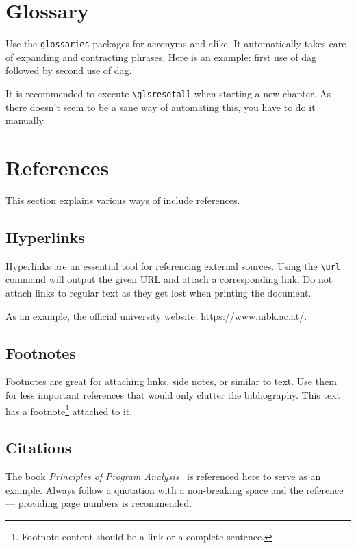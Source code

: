 \section{Glossary}

Use the \texttt{glossaries} packages for acronyms and alike.
It automatically takes care of expanding and contracting phrases.
Here is an example: first use of \gls{dag} followed by second use of \gls{dag}.

It is recommended to execute \texttt{\textbackslash{}glsresetall} when starting a new chapter.
As there doesn't seem to be a sane way of automating this, you have to do it manually.

\section{References}

This section explains various ways of include references.

\subsection{Hyperlinks}

Hyperlinks are an essential tool for referencing external sources.
Using the \texttt{\textbackslash{}url} command will output the given URL and attach a corresponding link.
Do not attach links to regular text as they get lost when printing the document.

As an example, the official university website: \url{https://www.uibk.ac.at/}.

\subsection{Footnotes}

Footnotes are great for attaching links, side notes, or similar to text.
Use them for less important references that would only clutter the bibliography.
This text has a footnote\footnote{Footnote content should be a link or a complete sentence.} attached to it.

\subsection{Citations}

The book \emph{Principles of Program Analysis}~\cite{Nielson:ppa} is referenced here to serve as an example.
Always follow a quotation with a non-breaking space and the reference --- providing page numbers is recommended.

